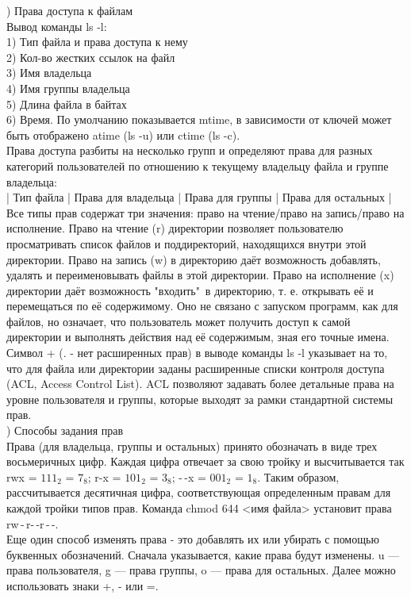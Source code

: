 ) Права доступа к файлам \\
Вывод команды ls -l: \\
1) Тип файла и права доступа к нему \\
2) Кол-во жестких ссылок на файл \\
3) Имя владельца \\
4) Имя группы владельца \\
5) Длина файла в байтах \\
6) Время. По умолчанию показывается mtime, в зависимости от ключей может быть отображено atime (ls -u) или ctime (ls -c). \\
Права доступа разбиты на несколько групп и определяют права для разных категорий пользователей по отношению к текущему владельцу файла и группе владельца: \\
| Тип файла | Права для владельца | Права для группы | Права для остальных | \\
Все типы прав содержат три значения: право на чтение/право на запись/право на исполнение. Право на чтение (r) директории позволяет пользователю просматривать список файлов и поддиректорий, находящихся внутри этой директории. Право на запись (w) в директорию даёт возможность добавлять, удалять и переименовывать файлы в этой директории. Право на исполнение (x) директории даёт возможность "входить"\, в директорию, т. е. открывать её и перемещаться по её содержимому. Оно не связано с запуском программ, как для файлов, но означает, что пользователь может получить доступ к самой директории и выполнять действия над её содержимым, зная его точные имена. \\
Символ + (. - нет расширенных прав) в выводе команды ls -l указывает на то, что для файла или директории заданы расширенные списки контроля доступа (ACL, Access Control List). ACL позволяют задавать более детальные права на уровне пользователя и группы, которые выходят за рамки стандартной системы прав. \\

) Способы задания прав \\
Права (для владельца, группы и остальных) принято обозначать в виде трех восьмеричных цифр. Каждая цифра отвечает за свою тройку и высчитывается так rwx = $111_2$ = $7_8$; r-x = $101_2$ = $3_8$; -\,-x = $001_2$ = $1_8$. Таким образом, рассчитывается десятичная цифра, соответствующая определенным правам для каждой тройки типов прав. Команда chmod 644 <имя файла> установит права rw\,-\,r-\,-r\,-\,-. \\
Еще один способ изменять права - это добавлять их или убирать с помощью буквенных обозначений. Сначала указывается, какие права будут изменены. u — права пользователя, g — права группы, o — права для остальных. Далее можно использовать знаки +, - или =. \\

